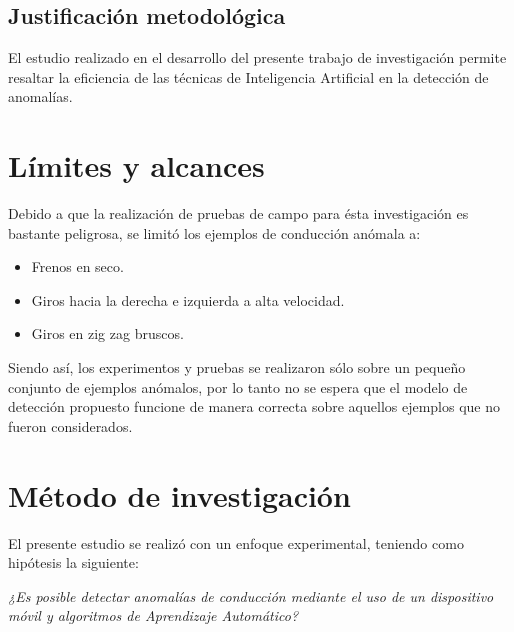 \subsection{Justificaci\'{o}n metodol\'{o}gica}

El estudio realizado en el desarrollo del presente trabajo de investigaci\'{o}n permite resaltar la eficiencia de las t\'{e}cnicas de Inteligencia Artificial en la detecci\'{o}n de anomal\'{i}as.

\section{L\'{i}mites y alcances}

Debido a que la realizaci\'{o}n de pruebas de campo para \'{e}sta investigaci\'{o}n es bastante peligrosa, se limit\'{o} los ejemplos de conducci\'{o}n an\'{o}mala a:

\begin{itemize}
\item Frenos en seco.
\item Giros hacia la derecha e izquierda a alta velocidad.
\item Giros en zig zag bruscos.
\end{itemize}

\vspace{5mm} %

Siendo as\'{i}, los experimentos y pruebas se realizaron s\'{o}lo sobre un peque\~{n}o conjunto de ejemplos an\'{o}malos, por lo tanto no se espera que el modelo de detecci\'{o}n propuesto funcione de manera correcta sobre aquellos ejemplos que no fueron considerados.

\section{M\'{e}todo de investigaci\'{o}n}

El presente estudio se realiz\'{o} con un enfoque experimental, teniendo como hip\'{o}tesis la siguiente:


\begin{center}
\textit{\large{¿Es posible detectar anomal\'{i}as de conducci\'{o}n mediante el uso de un dispositivo móvil y algoritmos de Aprendizaje Autom\'{a}tico?}}
\end{center}

